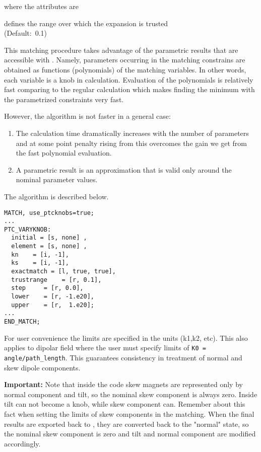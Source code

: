 where the attributes are
\begin{madlist}
   defines the range over which the expansion is
  trusted \\ (Default:~0.1)
\end{madlist}

This matching procedure takes advantage of the parametric results that
are accessible with \ptc. Namely, parameters occurring in the matching
constrains are obtained as functions (polynomials) of the matching
variables. In other words, each variable is a knob in \ptc
calculation. Evaluation of the polynomials is relatively fast comparing
to the regular \ptc calculation which makes finding the minimum with the
parametrized constraints very fast.  

However, the algorithm is not faster in a general case: 
\begin{enumerate}
   \item  The calculation time dramatically increases with the number of
     parameters and at some point penalty rising from this overcomes the
     gain we get from the fast polynomial evaluation.    
   \item  A parametric result is an approximation that is valid only
     around the nominal parameter values.     
\end{enumerate}

The algorithm is described below. \\
 
\begin{verbatim}
MATCH, use_ptcknobs=true;
...
PTC_VARYKNOB: 
  initial = [s, none] , 
  element = [s, none] , 
  kn    = [i, -1], 
  ks    = [i, -1], 
  exactmatch = [l, true, true], 
  trustrange    = [r, 0.1],  
  step     = [r, 0.0], 
  lower    = [r, -1.e20],
  upper    = [r,  1.e20]; 
...
END_MATCH;
\end{verbatim}

For user convenience the limits are specified in the \madx units (k1,k2,
etc). This also applies to dipolar field where the user must specify
limits of {\tt K0 = angle/path\_length}. This guarantees consistency in
treatment of normal and skew dipole components.   

{\bf Important:} Note that inside the code skew magnets are represented
only by normal component and tilt, so the nominal skew component is
always zero.  Inside \ptc tilt can not become a knob, while skew
component can.  Remember about this fact when setting the limits of skew
components in the matching.  When the final results are exported back to
\madx, they are converted back to the "normal" state, so the nominal
skew component is zero and tilt and normal component are modified
accordingly.

